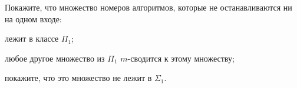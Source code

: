 Покажите, что множество номеров алгоритмов, которые не останавливаются ни на одном входе:
\begin{enumcyr}
    \item лежит в классе $\Pi_1$;
    \item любое другое множество из $\Pi_1$ $m$-сводится к этому множеству;
    \item покажите, что это множество не лежит в $\Sigma_1$.
\end{enumcyr}